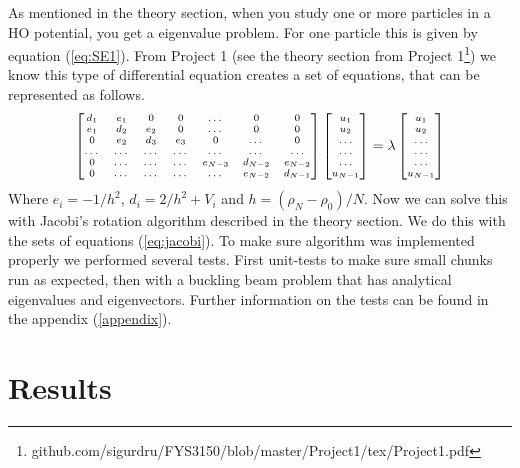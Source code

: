 \documentclass[reprint,english,notitlepage,nofootinbib]{revtex4-1}  %
\begin{document}
As mentioned in the theory section, when you study one or more particles in a HO potential, you get a eigenvalue problem. For one particle this is given by equation (\ref{eq:SE1}). From Project 1 (see the theory section from Project 1\footnote{github.com/sigurdru/FYS3150/blob/master/Project1/tex/Project1.pdf}) we know this type of differential equation creates a set of equations, that can be represented as follows.
\begin{equation}
  \label{eq:discrete_2nd_deriv_mat}
	\scriptsize{\begin{bmatrix}d_1 & e_1 & 0   & 0    & \dots  &0     & 0 \\
		e_1 & d_2 & e_2 & 0    & \dots  &0     &0 \\
		0   & e_2 & d_3 & e_3  &0       &\dots & 0\\
		\dots  & \dots & \dots & \dots  &\dots      &\dots & \dots\\
		0   & \dots & \dots & \dots  &  e_{N-3}     &d_{N-2} & e_{N-2}\\
		0   & \dots & \dots & \dots  &\dots       &e_{N-2} & d_{N-1}
	\end{bmatrix}  \begin{bmatrix} u_{1} \\
		u_{2} \\
		\dots\\ \dots\\ \dots\\
		u_{N-1}
	\end{bmatrix}=\lambda \begin{bmatrix} u_{1} \\
		u_{2} \\
		\dots\\ \dots\\ \dots\\
		u_{N-1}
	\end{bmatrix}}
\end{equation}
Where $e_i = -1/h^2$, $d_i = 2/h^2 + V_i$ and $h = (\rho_N - \rho_0)/N$. Now we can solve this with Jacobi's rotation algorithm described in the theory section. We do this with the sets of equations (\ref{eq:jacobi}). To make sure algorithm was implemented properly we performed several tests. First unit-tests to make sure small chunks run as expected, then with a buckling beam problem that has analytical eigenvalues and eigenvectors. Further information on the tests can be found in the appendix (\ref{appendix}).

\section{Results}
\end{document}
